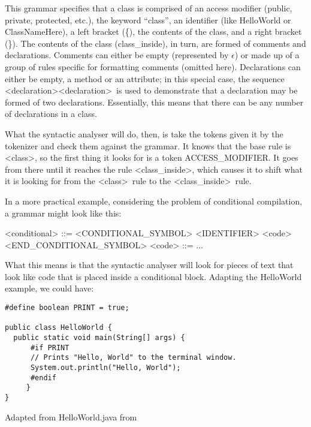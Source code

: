This grammar specifies that a class is comprised of an access modifier (public, private, protected, etc.), the keyword ``class'', an identifier (like HelloWorld or ClassNameHere), a left bracket (\{), the contents of the class, and a right bracket (\}). The contents of the class (class_inside), in turn, are formed of comments and declarations. Comments can either be empty (represented by $\epsilon$) or made up of a group of rules specific for formatting comments (omitted here). Declarations can either be empty, a method or an attribute; in this special case, the sequence \textless declaration\textgreater  \textless declaration\textgreater \ is used to demonstrate that a declaration may be formed of two declarations. Essentially, this means that there can be any number of declarations in a class.

What the syntactic analyser will do, then, is take the tokens given it by the tokenizer and check them against the grammar. It knows that the base rule is \textless class\textgreater , so the first thing it looks for is a token ACCESS_MODIFIER. It goes from there until it reaches the rule \textless class_inside\textgreater , which causes it to shift what it is looking for from the \textless class\textgreater \ rule to the \textless class_inside\textgreater \ rule.

In a more practical example, considering the problem of conditional compilation, a grammar might look like this:

\begin{listing}
\begin{grammar}
<conditional> ::= <CONDITIONAL_SYMBOL> <IDENTIFIER> <code> <END_CONDITIONAL_SYMBOL>
\alt <code> ::= ...
\end{grammar}
\end{listing}

What this means is that the syntactic analyser will look for pieces of text that look like code that is placed inside a conditional block. Adapting the HelloWorld example, we could have:

\begin{listing}
\begin{verbatim}
#define boolean PRINT = true;

public class HelloWorld {
  public static void main(String[] args) {
      #if PRINT
      // Prints "Hello, World" to the terminal window.
      System.out.println("Hello, World");
      #endif
     }
}
\end{verbatim}
\caption{Adapted from HelloWorld.java from \cite{SEDGEWICK:2011}} \label{lst:helloworldjavaconditional}
\end{listing}

